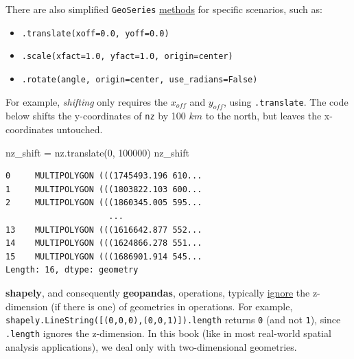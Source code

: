 \documentclass[
  letterpaper,
]{krantz}
\newenvironment{Shaded}{\begin{snugshade}}{\end{snugshade}}
\newcommand{\DecValTok}[1]{\textcolor[rgb]{0.68,0.00,0.00}{#1}}
\newcommand{\NormalTok}[1]{\textcolor[rgb]{0.00,0.23,0.31}{#1}}
\newcommand{\OperatorTok}[1]{\textcolor[rgb]{0.37,0.37,0.37}{#1}}
\providecommand{\tightlist}{%
  \setlength{\itemsep}{0pt}\setlength{\parskip}{0pt}}\usepackage{longtable,booktabs,array}
\begin{document}
There are also simplified \texttt{GeoSeries}
\href{https://geopandas.org/en/stable/docs/user_guide/geometric_manipulations.html\#affine-transformations}{methods}
for specific scenarios, such as:

\begin{itemize}
\tightlist
\item
  \texttt{.translate(xoff=0.0,\ yoff=0.0)}
\item
  \texttt{.scale(xfact=1.0,\ yfact=1.0,\ origin=\textquotesingle{}center\textquotesingle{})}
\item
  \texttt{.rotate(angle,\ origin=\textquotesingle{}center\textquotesingle{},\ use\_radians=False)}
\end{itemize}

For example, \emph{shifting} only requires the \(x_{off}\) and
\(y_{off}\), using \texttt{.translate}. The code below shifts the
y-coordinates of \texttt{nz} by 100 \(km\) to the north, but leaves the
x-coordinates untouched.

\begin{Shaded}
\begin{Highlighting}[]
\NormalTok{nz\_shift }\OperatorTok{=}\NormalTok{ nz.translate(}\DecValTok{0}\NormalTok{, }\DecValTok{100000}\NormalTok{)}
\NormalTok{nz\_shift}
\end{Highlighting}
\end{Shaded}

\begin{verbatim}
0     MULTIPOLYGON (((1745493.196 610...
1     MULTIPOLYGON (((1803822.103 600...
2     MULTIPOLYGON (((1860345.005 595...
                     ...                
13    MULTIPOLYGON (((1616642.877 552...
14    MULTIPOLYGON (((1624866.278 551...
15    MULTIPOLYGON (((1686901.914 545...
Length: 16, dtype: geometry
\end{verbatim}

\begin{tcolorbox}[enhanced jigsaw, title=\textcolor{quarto-callout-note-color}{\faInfo}\hspace{0.5em}{Note}, coltitle=black, colbacktitle=quarto-callout-note-color!10!white, breakable, titlerule=0mm, colframe=quarto-callout-note-color-frame, opacitybacktitle=0.6, colback=white, bottomrule=.15mm, left=2mm, leftrule=.75mm, toprule=.15mm, toptitle=1mm, bottomtitle=1mm, arc=.35mm, opacityback=0, rightrule=.15mm]

\textbf{shapely}, and consequently \textbf{geopandas}, operations,
typically
\href{https://shapely.readthedocs.io/en/stable/manual.html\#geometric-objects}{ignore}
the z-dimension (if there is one) of geometries in operations. For
example, \texttt{shapely.LineString({[}(0,0,0),(0,0,1){]}).length}
returns \texttt{0} (and not \texttt{1}), since \texttt{.length} ignores
the z-dimension. In this book (like in most real-world spatial analysis
applications), we deal only with two-dimensional geometries.

\end{tcolorbox}
\end{document}
